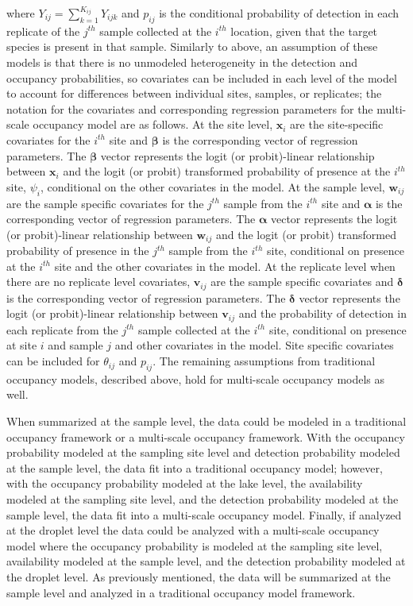 \documentclass[12pt]{article}\usepackage[]{graphicx}\usepackage[]{color}
\begin{document}
\noindent where $Y_{ij} = \sum_{k = 1}^{K_{ij}}Y_{ijk}$ and $p_{ij}$ is the conditional probability of detection in each replicate of the $j^{th}$ sample collected at the $i^{th}$ location, given that the target species is present in that sample. Similarly to above, an assumption of these models is that there is no unmodeled heterogeneity in the detection and occupancy probabilities, so covariates can be included in each level of the model to account for differences between individual sites, samples, or replicates; the notation for the covariates and corresponding regression parameters for the multi-scale occupancy model are as follows. At the site level, $\bm{x}_i$ are the site-specific covariates for the $i^{th}$ site and $\bm{\beta}$ is the corresponding vector of regression parameters. The $\bm\beta$ vector represents the logit (or probit)-linear relationship between $\bm{x}_i$ and the logit (or probit) transformed probability of presence at the $i^{th}$ site, $\psi_i$, conditional on the other covariates in the model. At the sample level, $\bm{w}_{ij}$ are the sample specific covariates for the $j^{th}$ sample from the $i^{th}$ site and $\bm{\alpha}$ is the corresponding vector of regression parameters. The $\bm{\alpha}$ vector represents the logit (or probit)-linear relationship between $\bm{w}_{ij}$ and the logit (or probit) transformed probability of presence in the $j^{th}$ sample from the $i^{th}$ site, conditional on presence at the $i^{th}$ site and the other covariates in the model. At the replicate level when there are no replicate level covariates, $\bm{v}_{ij}$ are the sample specific covariates and $\bm{\delta}$ is the corresponding vector of regression parameters. The $\bm{\delta}$ vector represents the logit (or probit)-linear relationship between $\bm{v}_{ij}$ and the probability of detection in each replicate from the $j^{th}$ sample collected at the $i^{th}$ site, conditional on presence at site $i$ and sample $j$ and other covariates in the model. Site specific covariates can be included for $\theta_{ij}$ and $p_{ij}$. The remaining assumptions from traditional occupancy models, described above, hold for multi-scale occupancy models as well.  

When summarized at the sample level, the data could be modeled in a traditional occupancy framework or a multi-scale occupancy framework. With the occupancy probability modeled at the sampling site level and detection probability modeled at the sample level, the data fit into a traditional occupancy model; however, with the occupancy probability modeled at the lake level, the availability modeled at the sampling site level, and the detection probability modeled at the sample level, the data fit into a multi-scale occupancy model. Finally, if analyzed at the droplet level the data could be analyzed with a multi-scale occupancy model where the occupancy probability is modeled at the sampling site level, availability modeled at the sample level, and the detection probability modeled at the droplet level. As previously mentioned, the data will be summarized at the sample level and analyzed in a traditional occupancy model framework. 
\end{document}
